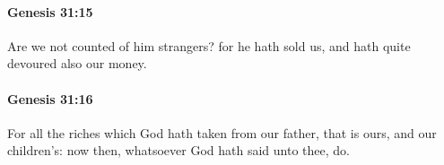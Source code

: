 		\paragraph{Genesis 31:15} %
			\label{GENESIS-31-15}

			Are we not counted of him strangers? for he hath sold us, and hath quite devoured also our money.


		\paragraph{Genesis 31:16} %
			\label{GENESIS-31-16}

			For all the riches which God hath taken from our father, that is ours, and our children's: now then, whatsoever God hath said unto thee, do.


